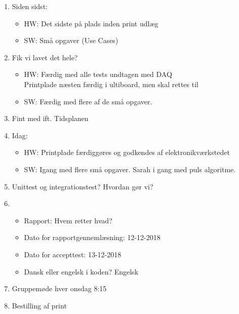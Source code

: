 \begin{enumerate}
	\item Siden sidst:
	\begin{itemize}
		\item HW: Det sidste på plads inden print udlæg
		\item SW: Små opgaver (Use Cases)
	\end{itemize}
	\item Fik vi lavet det hele?
	\begin{itemize}
		\item HW: Færdig med alle tests undtagen med DAQ \\ Printplade næsten færdig i ultiboard, men skal rettes til
		\item SW: Færdig med flere af de små opgaver.
	\end{itemize}
	\item Fint med ift. Tidsplanen
	\item Idag:
	\begin{itemize}
		\item HW: Printplade færdiggøres og godkendes af elektronikværkstedet
		\item SW: Igang med flere små opgaver. Sarah i gang med puls algoritme.
	\end{itemize}
	\item Unittest og integrationstest? Hvordan gør vi?
	\item \begin{itemize}
		\item Rapport: Hvem retter hvad?
		\item Dato for rapportgennemlæsning: 12-12-2018
		\item Dato for accepttest: 13-12-2018
		\item Dansk eller engelsk i koden? Engelsk
	\end{itemize}
	\item Gruppemøde hver onsdag 8:15
	\item Bestilling af print
\end{enumerate}

\clearpage